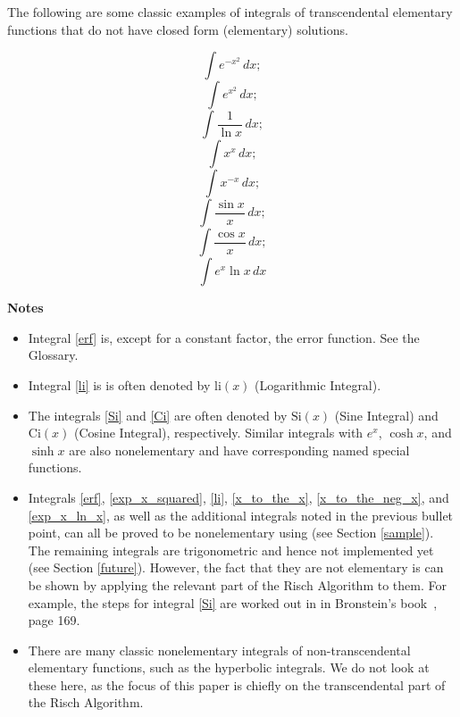 \renewcommand{\thefootnote}{\fnsymbol{footnote}}	
The following are some classic examples of integrals of \gls{transcendental}
\gls{elementary} functions that do not have closed form (\gls{elementary})
solutions.

\begin{equation}
\label{erf}
\int{e^{-x^2}\,dx};
\end{equation}
\begin{equation}
\label{exp_x_squared}
\int{e^{x^2}\,dx};
\end{equation}
\begin{equation}
\label{li}
\int{\frac{1}{\ln{x}}\,dx};
\end{equation}
\begin{equation}
\label{x_to_the_x}
\int{x^x\,dx};
\end{equation}
\begin{equation}
\label{x_to_the_neg_x}
\int{x^{-x}\,dx};
\end{equation}
\begin{equation}
\label{Si}
\int{\frac{\sin{x}}{x}\,dx};
\end{equation}
\begin{equation}
\label{Ci}
\int{\frac{\cos{x}}{x}\,dx};
\end{equation}
\begin{equation}
\label{exp_x_ln_x}
\int{e^x\ln{x}\,dx}
\end{equation}

\textbf{Notes}
\begin{itemize}
\item Integral \ref{erf} is, except for a constant factor, the
\gls{error function}.  See the Glossary.
\item Integral \ref{li} is is often denoted by $\mathrm{li}(x)$
(Logarithmic Integral).
\item The integrals \ref{Si} and \ref{Ci} are often denoted by
$\mathrm{Si}(x)$ (Sine Integral) and $\mathrm{Ci}(x)$ (Cosine Integral),
respectively.  Similar integrals with $e^x$, $\cosh{x}$, and $\sinh{x}$
are also nonelementary and have corresponding named special functions.
\item Integrals \ref{erf}, \ref{exp_x_squared}, \ref{li},
\ref{x_to_the_x}, \ref{x_to_the_neg_x}, and \ref{exp_x_ln_x}, as well as
the additional integrals noted in the previous bullet point, can all be
proved to be nonelementary using \rischintegrate{} (see Section \ref{sample}).
The remaining integrals are trigonometric and hence not implemented yet
(see Section \ref{future}).  However, the fact that they are not
\gls{elementary} is can be shown by applying the relevant part of the Risch
Algorithm to them. For example, the steps  for integral \ref{Si} are
worked out in in Bronstein's book~\cite{bronstein2005symbolic}, page 169.
\item There are many classic nonelementary integrals of
non-\gls{transcendental} \gls{elementary} functions, such as the hyperbolic
integrals.  We do not look at these here, as the focus of this paper is
chiefly on the \gls{transcendental} part of the Risch Algorithm.
\end{itemize}